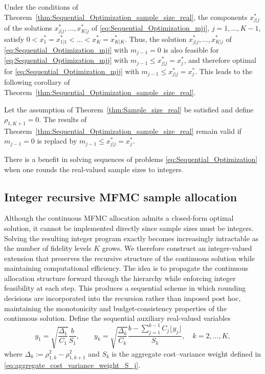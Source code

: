Under the conditions of  Theorem~\ref{thm:Sequential_Optimization_sample_size_real},
the components $x_{j|j}^*$ of the solutions $x_{j|j}^*, \ldots, x_{K|j}^*$ of \eqref{eq:Sequential_Optimization_mjj},
$j = 1, \ldots, K-1$,  satisfy $0 < x_1^* = x_{1|1}^* <  \ldots < x_K^* = x_{K|K}^*$.
Thus, the solution $x_{j|j}^*, \ldots, x_{K|j}^*$ of \eqref{eq:Sequential_Optimization_mjj} with $m_{j-1} = 0$ is
also feasible for  \eqref{eq:Sequential_Optimization_mjj} with $m_{j-1} \le x_{j|j}^* = x_j^*$,
and therefore optimal for \eqref{eq:Sequential_Optimization_mjj} with $m_{j-1} \le x_{j|j}^* = x_j^*$.
This leads to the following corollary of Theorem~\ref{thm:Sequential_Optimization_sample_size_real}.

\begin{corollary}  \label{cor:Sequential_Optimization_sample_size_real}
   Let the assumption of Theorem~\ref{thm:Sample_size_real} be satisfied and define $\rho_{1,K+1} = 0$.
   The results of Theorem~\ref{thm:Sequential_Optimization_sample_size_real} remain valid
   if $m_{j-1} = 0$ is replacd by $m_{j-1} \le x_{j|j}^* = x_j^*$.
\end{corollary}



There is a benefit in solving sequences of problems \eqref{eq:Sequential_Optimization} when
one rounds the real-valued sample sizes to integers.


\subsection{Integer recursive MFMC sample allocation}  
Although the continuous MFMC allocation admits a closed-form optimal solution,
it cannot be implemented directly since sample sizes must be integers.
Solving the resulting integer program exactly becomes increasingly
intractable as the number of fidelity levels $K$ grows.
We therefore construct an integer-valued extension that preserves
the recursive structure of the continuous solution
while maintaining computational efficiency. The idea is to propagate the continuous allocation structure forward through the hierarchy while enforcing integer feasibility at each step. This produces a sequential scheme in which rounding decisions are incorporated into the recursion rather than imposed post hoc, maintaining the monotonicity and budget-consistency properties of the continuous solution. Define the sequential auxiliary real-valued variables
\begin{equation}
\label{eq:MFMC_New_IntegerValued_Sample_Size}
y_1
=
\sqrt{\frac{\Delta_1}{C_1}}\frac{b}{S_1},
\qquad
y_k
=
\sqrt{\frac{\Delta_k}{C_k}}
\frac{b-\sum_{j=1}^{k-1} C_j \lfloor y_j \rfloor}{S_k},
\quad k=2,\ldots,K,
\end{equation}
where $\Delta_k := \rho_{1,k}^2 - \rho_{1,k+1}^2$ and $S_k$ is the aggregate cost–variance weight defined in \eqref{eq:aggregate_cost_variance_weight_S_j}. 



